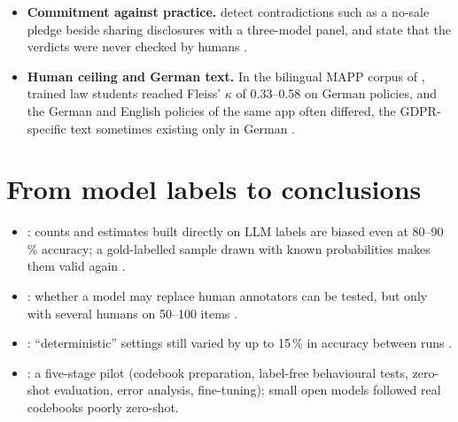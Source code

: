 \begin{itemize}
\item \textbf{Commitment against practice.}  detect contradictions such as a no-sale pledge beside sharing disclosures with a three-model panel, and state that the verdicts were never checked by humans .
\item \textbf{Human ceiling and German text.} In the bilingual MAPP corpus of , trained law students reached Fleiss' $\kappa$ of 0.33--0.58 on German policies, and the German and English policies of the same app often differed, the GDPR-specific text sometimes existing only in German .
\end{itemize}

\section{From model labels to conclusions}
\begin{itemize}
\item {}: counts and estimates built directly on LLM labels are biased even at 80--90\,\% accuracy; a gold-labelled sample drawn with known probabilities makes them valid again .
\item {}: whether a model may replace human annotators can be tested, but only with several humans on 50--100 items .
\item {}: ``deterministic'' settings still varied by up to 15\,\% in accuracy between runs .
\item {}: a five-stage pilot (codebook preparation, label-free behavioural tests, zero-shot evaluation, error analysis, fine-tuning); small open models followed real codebooks poorly zero-shot.
\end{itemize}

